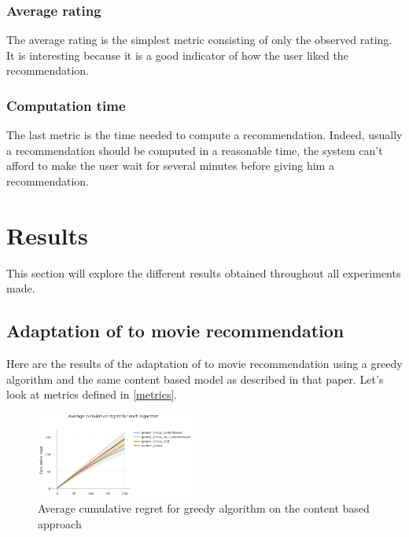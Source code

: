 \documentclass[letterpaper]{article}
\begin{document}
\subsubsection{Average rating}

The average rating is the simplest metric consisting of only the observed rating. It is interesting because it is a good indicator of how the user liked the recommendation.

\subsubsection{Computation time}

The last metric is the time needed to compute a recommendation. Indeed, usually a recommendation should be computed in a reasonable time, the system can't afford to make the user wait for several minutes before giving him a recommendation.

\section{Results} \label{results}

This section will explore the different results obtained throughout all experiments made.

\subsection{Adaptation of \cite{main} to movie recommendation}

Here are the results of the adaptation of \cite{main} to movie recommendation using a greedy algorithm and the same content based model as described in that paper. Let's look at metrics defined in \ref{metrics}.

\begin{figure}[H]
\begin{center}
\includegraphics[width=0.47\textwidth]{img/greedy0.png}
\caption{Average cumulative regret for greedy algorithm on the content based approach}
\label{greedy0}
\end{center}
\end{figure}
\end{document}
